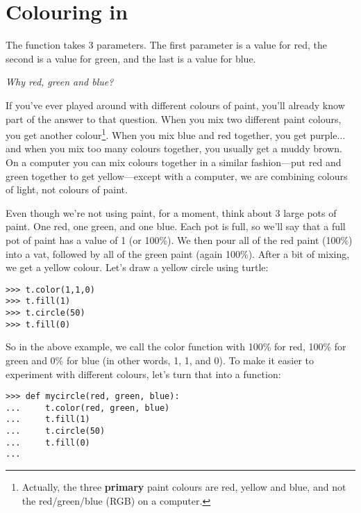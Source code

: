 \section{Colouring in}

The  function takes 3 parameters. The first parameter is a value for red, the second is a value for green, and the last is a value for blue.
\par
\emph{Why red, green and blue?}
\par
If you've ever played around with different colours of paint, you'll already know part of the answer to that question.  When you mix two different paint colours, you get another colour\footnote{Actually, the three \textbf{primary} paint colours are red, yellow and blue, and not the red/green/blue (RGB) on a computer.}.  When you mix blue and red together, you get purple$\ldots$ and when you mix too many colours together, you usually get a muddy brown. On a computer you can mix colours together in a similar fashion---put red and green together to get yellow---except with a computer, we are combining colours of light, not colours of paint.
 
Even though we're not using paint, for a moment, think about 3 large pots of paint.  One red, one green, and one blue.  Each pot is full, so we'll say that a full pot of paint has a value of 1 (or 100\%).  We then pour all of the red paint (100\%) into a vat, followed by all of the green paint (again 100\%).  After a bit of mixing, we get a yellow colour.  Let's draw a yellow circle using turtle:

\begin{listing}
\begin{verbatim}
>>> t.color(1,1,0)
>>> t.fill(1)
>>> t.circle(50)
>>> t.fill(0)
\end{verbatim}
\end{listing}

So in the above example, we call the color function with 100\% for red, 100\% for green and 0\% for blue (in other words, 1, 1, and 0).  To make it easier to experiment with different colours, let's turn that into a function:

\begin{listing}
\begin{verbatim}
>>> def mycircle(red, green, blue):
...     t.color(red, green, blue)
...     t.fill(1)
...     t.circle(50)
...     t.fill(0)
...
\end{verbatim}
\end{listing}

